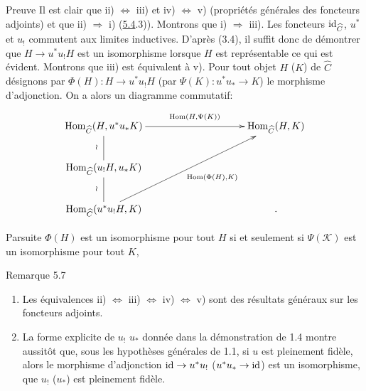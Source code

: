 \documentclass[10pt]{../fichiers-configuration-latex/smfart}
\def\labelenumi{(\theenumi)}
\begin{document}
\begin{enonce*}[remark]{Preuve}
Il est clair que ii) $\Leftrightarrow$ iii) et iv) $\Leftrightarrow$
v) (propriétés générales des foncteurs adjoints) et que ii)
$\Rightarrow$ i) (\hyperref[I.prop5.4]{5.4}.3)). Montrons que i) $\Rightarrow$
iii). Les foncteurs $\operatorname{id}_{\widehat{C}}$, $u^\ast$ et
$u_{!}$ commutent aux limites inductives. D'après (3.4), il suffit
donc de démontrer que $H\rightarrow u^\ast u_{!} H$ est un
isomorphisme lorsque $H$ est représentable ce qui est évident.
Montrons que %
iii) est équivalent à %
v). Pour tout objet $H$ (\resp  $K$) de $\widehat{C}$
désignons par $\Phi(H):H\rightarrow u^\ast u_{!} H$ (\resp  par
$\Psi(K):u^\ast u_\ast\rightarrow K$) le morphisme d'adjonction. On
a alors un diagramme commutatif:
\[
\xymatrix@C=3.5cm@L=6pt{
\Hom_{\widehat{C}}(H,u^{\ast}u_{\ast}
K)\ar@{-}[d]_{\wr}\ar[r]^{\quad \Hom(H,\Psi(K))}   & \Hom_{\widehat{C}}(H,K)\\
\Hom_{\widehat{C}}(u_{!}H,u_{\ast}K)\ar@{-}[d]_{\wr} &  \\
\Hom_{\widehat{C}}(u^{\ast}u_{!}H,K)\ar[uru]_{\quad
   \Hom(\Phi(H),K)} & .
}
\]

Par\pageoriginale suite $\Phi(H)$ est un isomorphisme pour tout $H$
si et seulement si $\Psi(𝒦)$ est un isomorphisme pour tout
$K$, \cqfd
\end{enonce*}

\begin{enonce*}[remark]{Remarque 5.7}
\begin{enumerate}
\renewcommand{\theenumi}{\alph{enumi}}
\renewcommand{\labelenumi}{\theenumi)}
\item Les équivalences ii) $\Leftrightarrow$ iii)
  $\Leftrightarrow$ iv) $\Leftrightarrow$ v) sont des résultats
  généraux sur les foncteurs adjoints.

\item La forme explicite de $u_{!}$ \resp  $u_\ast$ donnée dans la
  démonstration de 1.4 montre aussitôt que, sous les hypothèses
  générales de 1.1, si $u$ est pleinement fidèle, alors le
  morphisme d'adjonction $\operatorname{id}\rightarrow u^\ast u_{!}$ (\resp  $u^\ast
  u_\ast\rightarrow \operatorname{id}$) est un isomorphisme, \ie que $u_{!}$
  (\resp  $u_\ast$) est pleinement fidèle.
\end{enumerate}
\end{enonce*}

\setcounter{subsection}{8} \setcounter{subsubsection}{-1}
\end{document}
